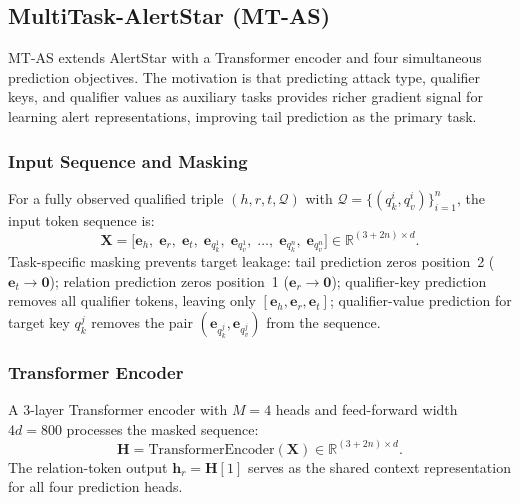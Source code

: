 \documentclass[10pt,journal,compsoc]{IEEEtran}
\begin{document}
\subsection{MultiTask-AlertStar (MT-AS)}
\label{ssec:mtas}

MT-AS extends AlertStar with a Transformer encoder and four
simultaneous prediction objectives.
The motivation is that predicting attack type, qualifier
keys, and qualifier values as auxiliary tasks provides
richer gradient signal for learning alert representations,
improving tail prediction as the primary task.

\subsubsection{Input Sequence and Masking}
For a fully observed qualified triple
$(h, r, t, \mathcal{Q})$ with
$\mathcal{Q} = \{(q_k^i, q_v^i)\}_{i=1}^n$,
the input token sequence is:
\begin{equation}
  \mathbf{X}
  = \bigl[\mathbf{e}_h,\;
    \mathbf{e}_r,\;
    \mathbf{e}_t,\;
    \mathbf{e}_{q_k^1},\; \mathbf{e}_{q_v^1},\;
    \ldots,\;
    \mathbf{e}_{q_k^n},\; \mathbf{e}_{q_v^n}\bigr]
  \in \mathbb{R}^{(3+2n)\times d}.
  \label{eq:mt_input}
\end{equation}
Task-specific masking prevents target leakage:
tail prediction zeros position~2 ($\mathbf{e}_t \to \mathbf{0}$);
relation prediction zeros position~1 ($\mathbf{e}_r \to \mathbf{0}$);
qualifier-key prediction removes all qualifier tokens,
leaving only $[\mathbf{e}_h, \mathbf{e}_r, \mathbf{e}_t]$;
qualifier-value prediction for target key $q_k^j$ removes
the pair $(\mathbf{e}_{q_k^j}, \mathbf{e}_{q_v^j})$ from
the sequence.

\subsubsection{Transformer Encoder}
A 3-layer Transformer encoder with $M{=}4$ heads and
feed-forward width $4d{=}800$ processes the masked sequence:
\begin{equation}
  \mathbf{H}
  = \mathrm{TransformerEncoder}(\mathbf{X})
  \in \mathbb{R}^{(3+2n)\times d}.
  \label{eq:mt_enc}
\end{equation}
The relation-token output $\mathbf{h}_r = \mathbf{H}[1]$
serves as the shared context representation for all four
prediction heads.
\end{document}
